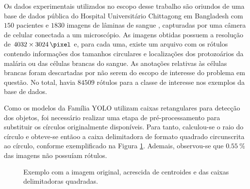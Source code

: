 
Os dados experimentais utilizados no escopo desse trabalho são oriundos de uma base de dados pública do Hospital Universitário Chittagong em Bangladesh com $150$ pacientes e $1830$ imagens de lâminas de sangue \cite{Yang:2020}, capturadas por uma câmera de celular conectada a um microscópio. As imagens obtidas possuem a resolução de $\SI[parse-numbers=false]{4032 \times 3024}{\pixel}$ e, para cada uma, existe um arquivo com os rótulos contendo informações dos tamanhos circulares e localizações dos protozoários da malária ou das células brancas do sangue. As anotações relativas às células brancas foram descartadas por não serem do escopo de interesse do problema em questão. No total, havia $\num{84509}$ rótulos para a classe de interesse nos exemplos da base de dados.

Como os modelos da Família YOLO utilizam caixas retangulares para detecção dos objetos, foi necessário realizar uma etapa de pré-processamento para substituir os círculos originalmente disponíveis. Para tanto, calculou-se o raio do círculo e obteve-se entãoo a caixa delimitadora de formato quadrado circunscrita ao círculo, conforme exemplificado na Figura \ref{fig:example-class}.  Ademais, observou-se que $\SI{0.55}{\percent}$ das imagens não possuíam rótulos.

 \begin{figure}[h!]
 	\centering
 	\hfill {}
 	\hfill {}
 	\hfill {}
 	\caption{Exemplo com a imagem original, acrescida de centroides e das caixas delimitadoras quadradas.}
 	\label{fig:example-class}
\end{figure}


